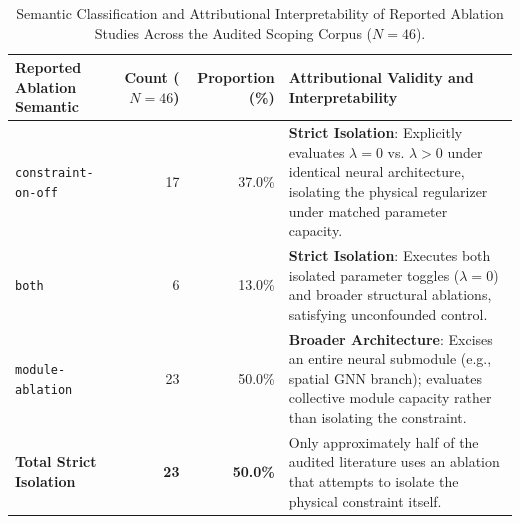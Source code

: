 \begin{table}[!t]
\centering
\footnotesize
\renewcommand{\arraystretch}{0.92}
\setlength{\tabcolsep}{3.5pt}
\caption{Semantic Classification and Attributional Interpretability of Reported Ablation Studies Across the Audited Scoping Corpus ($N=46$).}
\label{tab:ablation_semantics}
\begin{tabularx}{\textwidth}{p{4.0cm}rrX}
\toprule
\textbf{Reported Ablation Semantic} & \textbf{Count ($N=46$)} & \textbf{Proportion (\%)} & \textbf{Attributional Validity and Interpretability} \\
\midrule
\texttt{constraint-on-off} & 17 & 37.0\% & \textbf{Strict Isolation}: Explicitly evaluates $\lambda=0$ vs. $\lambda > 0$ under identical neural architecture, isolating the physical regularizer under matched parameter capacity. \\
\texttt{both} & 6 & 13.0\% & \textbf{Strict Isolation}: Executes both isolated parameter toggles ($\lambda=0$) and broader structural ablations, satisfying unconfounded control. \\
\texttt{module-ablation} & 23 & 50.0\% & \textbf{Broader Architecture}: Excises an entire neural submodule (e.g., spatial GNN branch); evaluates collective module capacity rather than isolating the constraint. \\
\midrule
\textbf{Total Strict Isolation} & \textbf{23} & \textbf{50.0\%} & Only approximately half of the audited literature uses an ablation that attempts to isolate the physical constraint itself. \\
\bottomrule
\end{tabularx}
\end{table}

